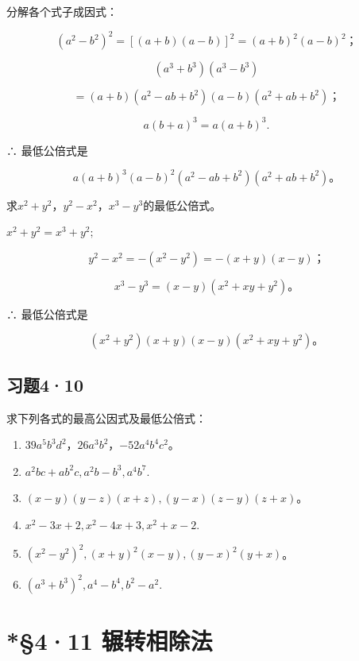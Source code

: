  分解各个式子成因式：

\[
(a ^{2} - b ^{2}) ^{2} = [ (a + b) (a - b) ] ^{2} = (a + b) ^{2} (a - b) ^{2}\text{；}
\]

\[
(a ^{3} + b ^{3}) (a ^{3} - b ^{3})
\]

\[
= (a + b) \left(a ^{2} - a b + b ^{2}\right) (a - b) \left(a ^{2} + a b + b ^{2}\right)\text{；}
\]

\[
a (b + a) ^{3} = a (a + b) ^{3}.
\]

∴ 最低公倍式是

\[
a (a + b) ^{3} (a - b) ^{2} \left(a ^{2} - a b + b ^{2}\right) \left(a ^{2} + a b + b ^{2}\right)\text{。}
\]

求\(x^{2}+y^{2}\)，\(y^{2}-x^{2}\)，\(x^{3}-y^{3}\)的最低公倍式。

\(x^{2} + y^{2} = x^{3} + y^{2};\)

\[
y ^{2} - x ^{2} = - \left(x ^{2} - y ^{2}\right) = - (x + y) (x - y)\text{；}
\]

\[
x ^{3} - y ^{3} = (x - y) \left(x ^{2} + x y + y ^{2}\right)\text{。}
\]

∴ 最低公倍式是

\[
(x ^{2} + y ^{2}) (x + y) (x - y) (x ^{2} + x y + y ^{2})\text{。}
\]

\subsection{习题4·10}

求下列各式的最高公因式及最低公倍式：

\begin{enumerate}[start=1]
\item
  \(39a^{5}b^{3}d^{2}\)，\(26a^{3}b^{2}\)，\(-52a^{4}b^{4}c^{2}\)。
\item
  \(a^2 bc + ab^2 c, a^2 b - b^3, a^4 b^7.\)
\item
  \((x - y)(y - z)(x + z), (y - x)(z - y)(z + x)\)。
\item
  \(x^{2} - 3x + 2, x^{2} - 4x + 3, x^{2} + x - 2.\)
\item
  \((x^{2} - y^{2})^{2}, (x + y)^{2}(x - y), (y - x)^{2}(y + x)\)。
\item
  \((a^3 + b^3)^2, a^4 - b^4, b^2 - a^2.\)
\end{enumerate}

\section{*§4·11 辗转相除法}

